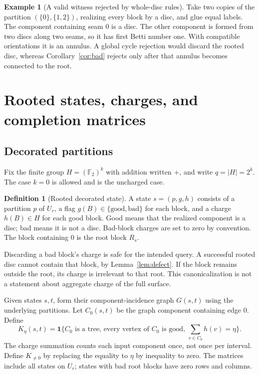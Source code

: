 \documentclass[11pt,letterpaper]{article}
\theoremstyle{definition}
\newtheorem{definition}[theorem]{Definition}
\newtheorem{example}[theorem]{Example}
\newcommand{\F}{\mathbb F}
\newcommand{\ind}[1]{\mathbf 1\{#1\}}
\begin{document}
\begin{example}[A valid witness rejected by whole-disc rules]\label{ex:junk}
Take two copies of the partition $(\{0\},\{1,2\})$, realizing every block by a disc, and glue equal labels. The component containing seam $0$ is a disc. The other component is formed from two discs along two seams, so it has first Betti number one. With compatible orientations it is an annulus. A global cycle rejection would discard the rooted disc, whereas Corollary~\ref{cor:bad} rejects only after that annulus becomes connected to the root.
\end{example}

\section{Rooted states, charges, and completion matrices}
\subsection{Decorated partitions}
Fix the finite group $H=(\F_2)^k$ with addition written $+$, and write $q=|H|=2^k$. The case $k=0$ is allowed and is the uncharged case.

\begin{definition}[Rooted decorated state]
A state $s=(p,g,h)$ consists of a partition $p$ of $U_r$, a flag $g(B)\in\{\mathrm{good},\mathrm{bad}\}$ for each block, and a charge $h(B)\in H$ for each good block. Good means that the realized component is a disc; bad means it is not a disc. Bad-block charges are set to zero by convention. The block containing $0$ is the root block $R_s$.
\end{definition}

Discarding a bad block's charge is safe for the intended query. A successful rooted disc cannot contain that block, by Lemma~\ref{lem:defect}. If the block remains outside the root, its charge is irrelevant to that root. This canonicalization is not a statement about aggregate charge of the full surface.

Given states $s,t$, form their component-incidence graph $G(s,t)$ using the underlying partitions. Let $C_0(s,t)$ be the graph component containing edge $0$. Define
\begin{equation}
 K_\eta(s,t)=\ind{C_0\text{ is a tree, every vertex of }C_0\text{ is good, }
             \sum_{v\in C_0}h(v)=\eta}.\label{eq:K}
\end{equation}
The charge summation counts each input component once, not once per interval. Define $K_{\ne0}$ by replacing the equality to $\eta$ by inequality to zero. The matrices include all states on $U_r$; states with bad root blocks have zero rows and columns.
\end{document}
